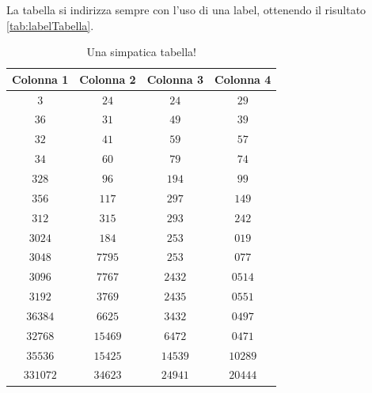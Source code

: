 La tabella si indirizza sempre con l'uso di una label, ottenendo il risultato \autoref{tab:labelTabella}.

\begin{table}
    \caption{Una simpatica tabella!}\label{tab:labelTabella}
    \begin{center}
    \begin{tabular}{c|c|c|c}
        \textbf{Colonna 1} & \textbf{Colonna 2} & \textbf{Colonna 3} & \textbf{Colonna 4} \\
        \hline
            $3$      & $24$     & $24$    & $29$ \\ 
            $36$     & $31$     & $49$    & $39$ \\ 
            $32$     & $41$     & $59$    & $57$ \\ 
            $34$     & $60$     & $79$    & $74$ \\ 
            $328$    & $96$     & $194$   & $99$ \\ 
            $356$    & $117$    & $297$   & $149$ \\ 
            $312$    & $315$    & $293$   & $242$ \\ 
            $3024$   & $184$    & $253$   & $019$ \\ 
            $3048$   & $7795$   & $253$   & $077$ \\ 
            $3096$   & $7767$   & $2432$  & $0514$ \\ 
            $3192$   & $3769$   & $2435$  & $0551$ \\ 
            $36384$  & $6625$   & $3432$  & $0497$ \\ 
            $32768$  & $15469$  & $6472$  & $0471$ \\ 
            $35536$  & $15425$  & $14539$ & $10289$ \\ 
            $331072$ & $34623$  & $24941$ & $20444$ \\  
        \end{tabular}
    \end{center}
\end{table}

\clearpage
